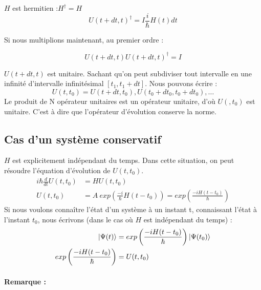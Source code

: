 \documentclass[12pt,a4paper,titlepage]{book}
\begin{document}
$H$ est hermitien :$H^\dagger = H$
\begin{equation*}
U(t+dt, t)^\dagger = I \frac{i}{\hbar} H(t) dt
\end{equation*}

Si nous multiplions maintenant, au premier ordre :

\begin{equation*}
U(t+dt, t)U(t+dt, t)^\dagger = I
\end{equation*}

$U(t+dt,t)$ est unitaire. Sachant qu'on peut subdiviser tout intervalle en une infinité d'intervalle infinitésimal $[t_1, t_1 +dt]$. Nous pouvons écrire :
\begin{equation*}
U(t, t_0) = U(t+dt, t_0), U(t_0+dt_0, t_0+dt_0), \ldots
\end{equation*}
Le produit de N opérateur unitaires est un opérateur unitaire, d'où $U(, t_0)$ est unitaire. C'est à dire que l'opérateur d'évolution conserve la norme.

\subsection{Cas d'un système conservatif}
$H$ est explicitement indépendant du temps. Dans cette situation, on peut résoudre l'équation d'évolution de $U(t, t_0)$.
\begin{align*}
i\hbar \frac{d}{dt} U(t,t_0) &= HU(t, t_0)\\
U(t, t_0) &= A ~exp \left( \frac{-i}{\hbar} H(t-t_0) \right) = exp \left( \frac{-i H (t-t_0)}{\hbar} \right)
\end{align*}
Si nous voulons connaître l'état d'un système à un instant t, connaissant l'état à l'instant $t_0$, nous écrivons (dans le cas où $H$ est indépendant du temps) :
\begin{align*}
\ket{\Psi (t)} &= exp \left( \frac{-i H (t-t_0)}{\hbar} \right) \ket{\Psi (t_0)}\\
exp \left( \frac{-i H (t-t_0)}{\hbar} \right) &= U (t, t_0)
\end{align*}

\paragraph*{Remarque :}
\end{document}
